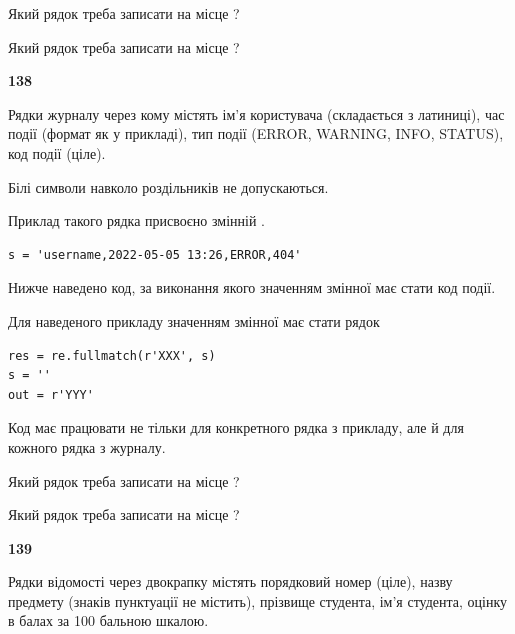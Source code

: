 Який рядок треба записати на місце  ?\par
\vspace{5mm}


Який рядок треба записати на місце  ?\par


\newpage

{\begin {center}\textbf{ 138}\end {center}}\par
Рядки журналу через кому містять ім'я користувача (складається з латиниці), час події (фор\-мат як у прикладі), тип події (ERROR, WARNING, INFO, STATUS), код події (ціле).

Білі символи навколо роздільників не допускаються.

Приклад такого рядка присвоєно змінній .



\begin{verbatim}
s = 'username,2022-05-05 13:26,ERROR,404'
\end{verbatim}


Нижче наведено код, за виконання якого значенням змінної  має стати код події.

Для наведеного прикладу значенням змінної  має стати рядок 



\begin{verbatim}
res = re.fullmatch(r'XXX', s)
s = ''
out = r'YYY'
\end{verbatim}


Код має працювати не тільки для конкретного рядка з прикладу, але й для кожного рядка з журналу.




Який рядок треба записати на місце  ?\par
\vspace{5mm}


Який рядок треба записати на місце  ?\par


\newpage

{\begin {center}\textbf{ 139}\end {center}}\par
Рядки відомості через двокрапку містять порядковий номер (ціле), назву предмету (знаків пунктуації не містить), прізвище студента, ім'я студента, оцінку в балах за 100 бальною шкалою.

